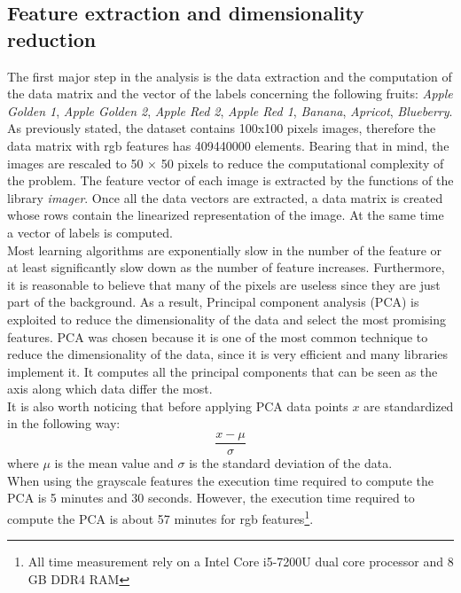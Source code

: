 \documentclass{article}
\begin{document}
\subsection{Feature extraction and dimensionality reduction}
The first major step in the analysis is the data extraction and the computation of the data matrix and the vector of the labels concerning the following fruits: \textit{Apple Golden 1}, \textit{Apple Golden 2}, \textit{Apple Red 2}, \textit{Apple Red 1}, \textit{Banana}, \textit{Apricot}, \textit{Blueberry}. \\
As previously stated, the dataset contains 100x100 pixels images, therefore the data matrix with rgb features has 409440000 elements. Bearing that in mind, the images are rescaled to 50 $\times$ 50 pixels to reduce the computational complexity of the problem.  The feature vector of each image is extracted by the functions of the library \textit{imager}. Once all the data vectors are extracted, a data matrix is created whose rows contain the linearized representation of the image. At the same time a vector of labels is computed.\\
Most learning algorithms are exponentially slow in the number of the feature or at least significantly slow down as the number of feature increases. Furthermore, it is reasonable to believe that many of the pixels are useless since they are just part of the background. As a result, Principal component analysis (PCA) is exploited to reduce the dimensionality of the data and select the most promising features. PCA was chosen because it is one of the most common technique to reduce the dimensionality of the data, since it is very efficient and many libraries implement it. It computes all the principal components that can be seen as the axis along which data differ the most.\\
It is also worth noticing that before applying PCA data points $x$ are standardized in the following way:
\begin{equation}
 \frac{x - \mu}{\sigma}
\end{equation}
\noindent where $\mu$ is the mean value and $\sigma$ is the standard deviation of the data. \\
When using the grayscale features the execution time required to compute the PCA is 5 minutes and 30 seconds. However, the execution time required to compute the PCA is about 57 minutes for rgb features\footnote{All time measurement rely on a Intel Core i5-7200U dual core processor and 8 GB DDR4 RAM}.
\end{document}
